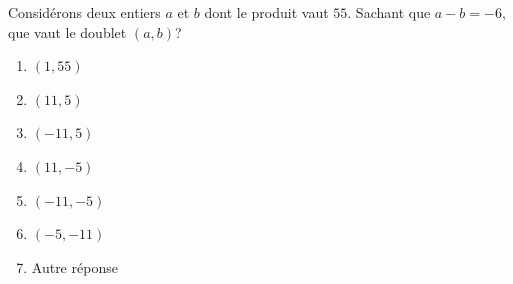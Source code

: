 % 
%
Considérons deux entiers $a$ et $b$ dont le produit vaut $55$. Sachant que $a-b = \minus 6$, que vaut le doublet $(a, b)$?
%
\begin{enumerate} 
  \item $(1,55)$
  \item $(11,5)$
  \item $(\minus 11,5)$
  \item $(11, \minus 5)$
  \item $(\minus 11,\minus 5)$
  \item $(\minus 5,\minus 11)$
  \item Autre réponse
\end{enumerate}
% 
